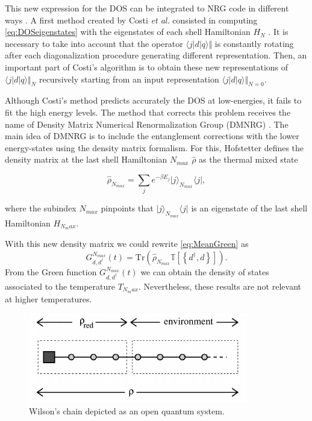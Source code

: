 \noindent This new expression for the DOS can be integrated to NRG code in different ways . A first method created by Costi \textit{et al.} consisted in computing \eqref{eq:DOSeigenstates} with the eigenstates of each shell Hamiltonian $H_N$  \cite{costi_transport_1994}. It is necessary to take into account that the operator $\langle j\vert d\vert q\rangle\Vert$ is constantly rotating after each diagonalization procedure generating different representation. Then, an important part of Costi's algorithm is to obtain these new representations of $\langle j\vert d\vert q\rangle\Vert_N$ recursively starting from an input representation $\langle j\vert d\vert q\rangle\Vert_{N=0}$.

Although Costi's method predicts accurately the DOS at low-energies, it fails to fit the high energy levels. The method that corrects this problem receives the name of Density Matrix Numerical Renormalization Group (DMNRG) \cite{hofstetter_generalized_2000}. The main idea of DMNRG is to include the entanglement corrections with the lower energy-states using the density matrix formalism. For this, Hofstetter defines the density matrix at the last shell Hamiltonian $N_{max}$ $\hat{\rho}$ as the thermal mixed state 

\begin{equation}
\hat{\rho}_{N_{max}} = \sum_{j}e^{-\beta E_{j}}\vert j          \rangle_{N_{max}} \langle j\vert, \label{eq:rho_n}
\end{equation}

\noindent where the subindex $N_{max}$ pinpoints that $\vert j \rangle_{N_{max}} \langle j\vert$ is an eigenstate of the last shell Hamiltonian $H_{N_max}$. 

With this new density matrix we could rewrite \ref{eq:MeanGreen} as 
\begin{equation}
G_{d,d^{\dagger}}^{N_{max}}(t) = \text{Tr} \left( \hat{\rho}_{N_{max}}\mathbb{T}\left[\left\{ d^{\dagger},d\right\} \right]\right). 
\end{equation}
\noindent From the Green function $G_{d,d^{\dagger}}^{N_{max}}(t)$ we can obtain the density of states associated to the temperature $T_{N_max}$. Nevertheless, these results are not relevant at higher temperatures. 

\begin{figure}
\centering
\includegraphics[scale=1]{IMAGES/DQD/DMRGchain.png}
\caption{\label{fig:OpenQuantum} Wilson's chain depicted as an open quantum system.  }
\end{figure}

